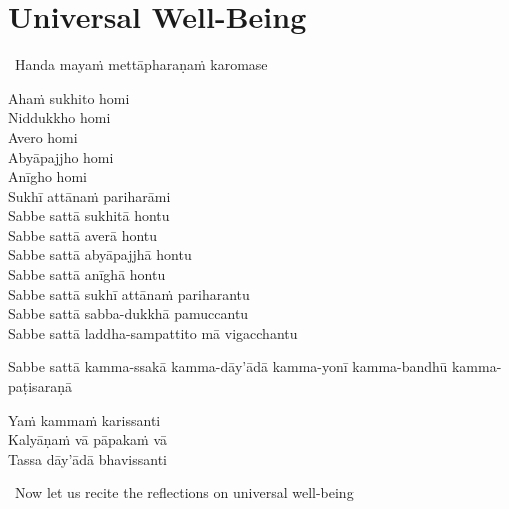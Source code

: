\suttaRef{[Trad]}

\ifdigital{}\fi



\section{Universal Well-Being}
\label{universal-well-being}

\begin{leader}
  \anglebracketleft\ \hspace{-0.5mm}Handa mayaṁ mettāpharaṇaṁ karomase \hspace{-0.5mm}\anglebracketright\
\end{leader}

Ahaṁ sukhito homi\\
Niddukkho homi\\
Avero homi\\
Abyāpajjho homi\\
Anīgho homi\\
Sukhī attānaṁ pariharāmi\\
Sabbe sattā sukhitā hontu\\
Sabbe sattā averā hontu\\
Sabbe sattā abyāpajjhā hontu\\
Sabbe sattā anīghā hontu\\
Sabbe sattā sukhī attānaṁ pariharantu\\
Sabbe sattā sabba-dukkhā pamuccantu\\
Sabbe sattā laddha-sampattito mā vigacchantu

\bigskip

\begin{pali-hang-together}
  Sabbe sattā kamma-ssakā kamma-dāy'ādā kamma-yonī kamma-bandhū kamma-paṭisaraṇā\\
\end{pali-hang-together}
Yaṁ kammaṁ karissanti\\
Kalyāṇaṁ vā pāpakaṁ vā\\
Tassa dāy'ādā bhavissanti

\clearpage

\begin{leader-english}
  \anglebracketleft\ \hspace{-0.5mm}Now let us recite the reflections on universal well-being \hspace{-0.5mm}\anglebracketright\
\end{leader-english}

